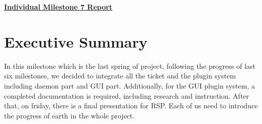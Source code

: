 \documentclass{article}
\begin{document}
\pagestyle{headings}

\begin{center}
{\LARGE\textbf{\underline{{Individual Milestone 7 Report}}}}
\end{center}

\section*{Executive Summary}

In this milestone which is the last spring of project, following the progress of last six milestones, we decided to integrate all the ticket and the plugin system including daemon part and GUI part. Additionally, for the GUI plugin system, a completed documentation is required, including research and instruction. After that, on friday, there is a final presentation for RSP. Each of us need to introduce the progress of earth in the whole project.
\end{document}
